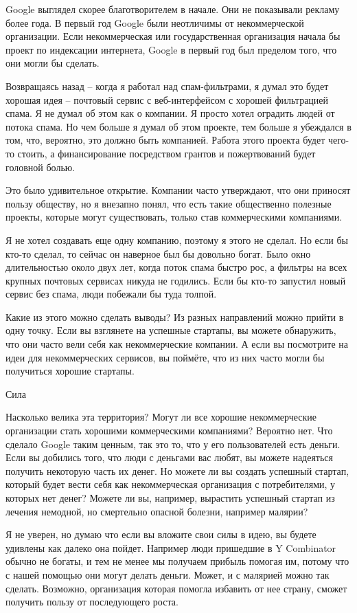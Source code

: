 \documentclass[ebook,12pt,oneside,openany]{memoir}
\begin{document}
Google выглядел скорее благотворителем в начале. Они не показывали
рекламу более года. В первый год Google были неотличимы от
некоммерческой организации. Если некоммерческая или государственная
организация начала бы проект по индексации интернета, Google в первый
год был пределом того, что они могли бы сделать.

Возвращаясь назад -- когда я работал над спам-фильтрами, я думал это
будет хорошая идея -- почтовый сервис с веб-интерфейсом с хорошей
фильтрацией спама. Я не думал об этом как о компании. Я просто хотел
оградить людей от потока спама. Но чем больше я думал об этом проекте,
тем больше я убеждался в том, что, вероятно, это должно быть
компанией. Работа этого проекта будет чего-то стоить, а финансирование
посредством грантов и пожертвований будет головной болью.

Это было удивительное открытие. Компании часто утверждают, что они
приносят пользу обществу, но я внезапно понял, что есть такие
общественно полезные проекты, которые могут существовать, только став
коммерческими компаниями.

Я не хотел создавать еще одну компанию, поэтому я этого не сделал. Но
если бы кто-то сделал, то сейчас он наверное был бы довольно богат.
Было окно длительностью около двух лет, когда поток спама быстро рос,
а фильтры на всех крупных почтовых сервисах никуда не годились. Если
бы кто-то запустил новый сервис без спама, люди побежали бы туда
толпой.

Какие из этого можно сделать выводы? Из разных направлений можно
прийти в одну точку. Если вы взглянете на успешные стартапы, вы можете
обнаружить, что они часто вели себя как некоммерческие компании. А
если вы посмотрите на идеи для некоммерческих сервисов, вы поймёте,
что из них часто могли бы получиться хорошие стартапы.

Сила

Насколько велика эта территория? Могут ли все хорошие некоммерческие
организации стать хорошими коммерческими компаниями? Вероятно нет. Что
сделало Google таким ценным, так это то, что у его пользователей есть
деньги. Если вы добились того, что люди с деньгами вас любят, вы
можете надеяться получить некоторую часть их денег. Но можете ли вы
создать успешный стартап, который будет вести себя как некоммерческая
организация с потребителями, у которых нет денег? Можете ли вы,
например, вырастить успешный стартап из лечения немодной, но
смертельно опасной болезни, например малярии?

Я не уверен, но думаю что если вы вложите свои силы в идею, вы будете
удивлены как далеко она пойдет. Например люди пришедшие в Y Combinator
обычно не богаты, и тем не менее мы получаем прибыль помогая им,
потому что с нашей помощью они могут делать деньги. Может, и с
малярией можно так сделать. Возможно, организация которая помогла
избавить от нее страну, сможет получить пользу от последующего роста.
\end{document}
